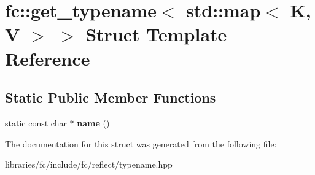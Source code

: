 \hypertarget{structfc_1_1get__typename_3_01std_1_1map_3_01_k_00_01_v_01_4_01_4}{}\section{fc\+:\+:get\+\_\+typename$<$ std\+:\+:map$<$ K, V $>$ $>$ Struct Template Reference}
\label{structfc_1_1get__typename_3_01std_1_1map_3_01_k_00_01_v_01_4_01_4}
\subsection*{Static Public Member Functions}
\begin{DoxyCompactItemize}
\item 
\mbox{\label{structfc_1_1get__typename_3_01std_1_1map_3_01_k_00_01_v_01_4_01_4_a1c38b895050ff5ed1055a8a80d16595a}} 
static const char $\ast$ {\bfseries name} ()
\end{DoxyCompactItemize}


The documentation for this struct was generated from the following file\+:\begin{DoxyCompactItemize}
\item 
libraries/fc/include/fc/reflect/typename.\+hpp\end{DoxyCompactItemize}
